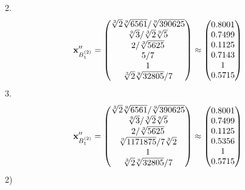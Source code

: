 \documentclass[10pt,a4paper]{article}
\begin{document}
	2.
	\[
		\bold{x}''_{B_1^{(2)}} = 
		\begin{pmatrix}
			{\sqrt[3]{2}\sqrt[9]{6561}} / {\sqrt[9]{390625}} \\
			{\sqrt[9]{3}} / {\sqrt[3]{2}\sqrt[9]{5}} \\
			{{2}} / {\sqrt[3]{5625}} \\
			{{5}} / {{7}} \\
			{1}{} \\
			{\sqrt[3]{2}\sqrt[9]{32805}} / {{7}} \\
		\end{pmatrix}
		\approx
		\begin{pmatrix}
			0.8001   \\
			0.7499   \\
			0.1125   \\
			0.7143   \\
			1        \\
			0.5715   \\
		\end{pmatrix}
	\]
	3.
	\[
		\bold{x}''_{B_1^{(2)}} = 
		\begin{pmatrix}
			{\sqrt[3]{2}\sqrt[9]{6561}} / {\sqrt[9]{390625}} \\
			{\sqrt[9]{3}} / {\sqrt[3]{2}\sqrt[9]{5}} \\
			{{2}} / {\sqrt[3]{5625}} \\
			{\sqrt[9]{1171875}} / {{7}\sqrt[3]{2}} \\
			{1}{} \\
			{\sqrt[3]{2}\sqrt[9]{32805}} / {{7}} \\
		\end{pmatrix}
		\approx
		\begin{pmatrix}
			0.8001   \\
			0.7499   \\
			0.1125   \\
			0.5356   \\
			1        \\
			0.5715   \\
		\end{pmatrix}
	\]
	2)
\end{document}
